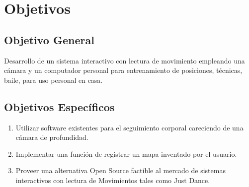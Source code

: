 \chapter{Objetivos}


\section{Objetivo General}

Desarrollo de un sistema interactivo con lectura de movimiento empleando una cámara y un computador personal para entrenamiento de posiciones, técnicas, baile, para uso personal en casa.

\section{Objetivos Específicos}

\begin{enumerate}
	\item Utilizar software existentes para el seguimiento corporal careciendo de una cámara de profundidad.
	\item Implementar una función de registrar un mapa inventado por el usuario.
	\item Proveer una alternativa Open Source factible al mercado de sistemas interactivos con lectura de Movimientos tales como Just Dance.
\end{enumerate}

